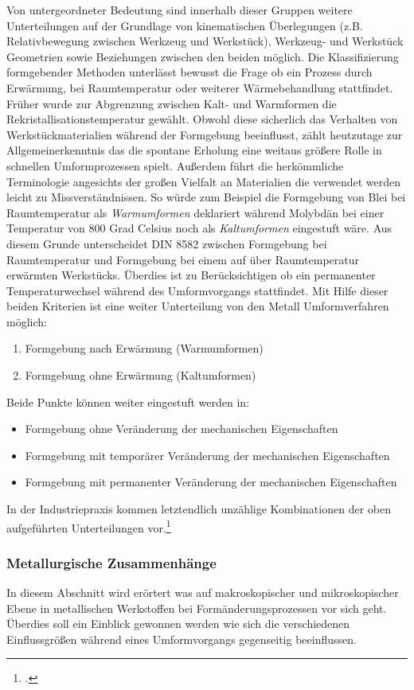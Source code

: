 \documentclass[12pt,a4paper,parskip]{scrartcl}
\begin{document}
{Von untergeordneter Bedeutung sind innerhalb dieser Gruppen  weitere Unterteilungen auf der Grundlage von kinematischen Überlegungen (z.B. Relativbewegung zwischen Werkzeug und Werkstück), Werkzeug- und Werkstück Geometrien sowie Beziehungen zwischen den beiden möglich. Die Klassifizierung formgebender Methoden unterlässt bewusst die Frage ob ein Prozess durch Erwärmung, bei Raumtemperatur oder weiterer Wärmebehandlung stattfindet. Früher  wurde zur Abgrenzung zwischen Kalt- und Warmformen die Rekristallisationstemperatur gewählt. Obwohl diese sicherlich das Verhalten  von Werkstückmaterialien während der Formgebung beeinflusst, zählt heutzutage zur Allgemeinerkenntnis das die spontane Erholung  eine weitaus größere Rolle in schnellen Umformprozessen spielt. Außerdem führt die herkömmliche Terminologie angesichts der großen Vielfalt  an Materialien die verwendet werden leicht zu Missverständnissen. So würde zum Beispiel die Formgebung von Blei bei Raumtemperatur als \emph{Warmumformen} deklariert während Molybdän bei einer Temperatur von 800 Grad Celsius noch als \emph{Kaltumformen} eingestuft wäre. Aus diesem Grunde unterscheidet DIN 8582 zwischen Formgebung bei Raumtemperatur und Formgebung bei einem auf über Raumtemperatur erwärmten Werkstücks. Überdies ist zu Berücksichtigen ob ein permanenter Temperaturwechsel während des Umformvorgangs stattfindet. Mit Hilfe dieser beiden Kriterien ist eine weiter Unterteilung von den Metall Umformverfahren möglich:

\begin{enumerate}
\item Formgebung nach Erwärmung (Warmumformen)
\item Formgebung ohne Erwärmung (Kaltumformen)
\end{enumerate}

Beide Punkte können weiter eingestuft werden in:

\begin{itemize}
\item Formgebung ohne Veränderung der mechanischen Eigenschaften
\item Formgebung mit temporärer Veränderung der mechanischen Eigenschaften
\item Formgebung mit permanenter Veränderung der mechanischen Eigenschaften
\end{itemize}

In der Industriepraxis kommen letztendlich unzählige Kombinationen der oben aufgeführten Unterteilungen vor.\footcite[Vgl.][2.1ff]{kl}
\subsubsection{Metallurgische Zusammenhänge}
In diesem Abschnitt wird erörtert was auf makroskopischer und mikroskopischer Ebene in metallischen Werkstoffen bei Formänderungsprozessen vor sich geht. Überdies soll ein Einblick gewonnen werden wie sich die verschiedenen Einflussgrößen während eines Umformvorgangs gegenseitig beeinflussen.


}
\end{document}
